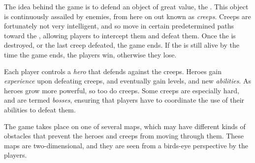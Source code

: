 The idea behind the game is to defend an object of great value, the \objective.
This object is continuously assailed by enemies, from here on out known as \emph{creeps}.
Creeps are fortunately not very intelligent, and so move in certain predetermined
paths toward the \objective, allowing players to intercept them and defeat them.
Once the \objective is destroyed, or the last creep defeated, the game ends. If
the \objective is still alive by the time the game ends, the players win, otherwise
they lose.

Each player controls a \emph{hero} that defends against the creeps. Heroes gain
\emph{experience} upon defeating creeps, and eventually gain levels, and new \emph{abilities}.
As heroes grow more powerful, so too do creeps. Some creeps are especially hard, and
are termed \emph{bosses}, ensuring that players have to coordinate the use of their
abilities to defeat them.

The game takes place on one of several maps, which may have different kinds of
obstacles that prevent the heroes and creeps from moving through them. These
maps are two-dimensional, and they are seen from a birds-eye perspective by
the players.
